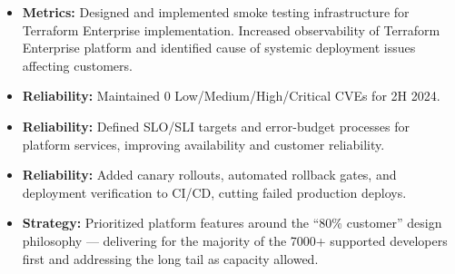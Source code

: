 \documentclass[11pt]{article}
\begin{document}
\begin{description}
\begin{itemize}
  \item \textbf{Metrics:} Designed and implemented smoke testing infrastructure for Terraform Enterprise implementation. Increased observability of Terraform Enterprise platform and identified cause of systemic deployment issues affecting customers.
  \item \textbf{Reliability:} Maintained 0 Low/Medium/High/Critical CVEs for 2H 2024.
  \item \textbf{Reliability:} Defined SLO/SLI targets and error-budget processes for platform services, improving availability and customer reliability.
  \item \textbf{Reliability:} Added canary rollouts, automated rollback gates, and deployment verification to CI/CD, cutting failed production deploys.
  \item \textbf{Strategy:} Prioritized platform features around the ``80\% customer'' design philosophy — delivering for the majority of the 7000+ supported developers first and addressing the long tail as capacity allowed.
\end{itemize}
\end{description}
\end{document}
